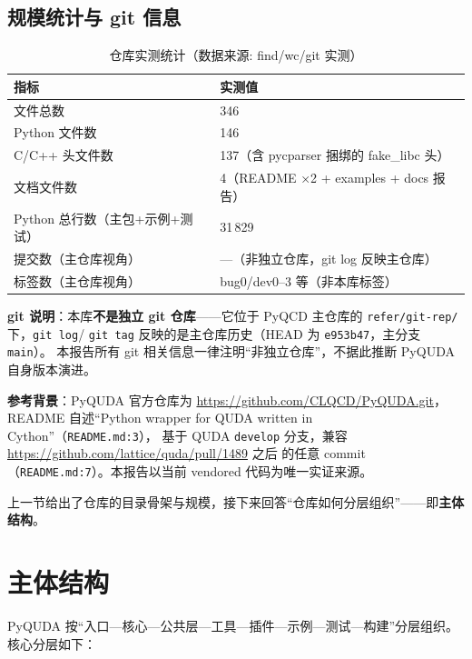 \documentclass[UTF8]{ctexart}
\begin{document}
\subsection{规模统计与 git 信息}
\begin{table}[htbp]\centering
\begin{tabular}{ll}
\toprule
指标 & 实测值 \\
\midrule
文件总数 & 346 \\
Python 文件数 & 146 \\
C/C++ 头文件数 & 137（含 pycparser 捆绑的 fake\_libc 头） \\
文档文件数 & 4（README ×2 + examples + docs 报告） \\
Python 总行数（主包+示例+测试） & 31\,829 \\
提交数（主仓库视角） & —（非独立仓库，git log 反映主仓库） \\
标签数（主仓库视角） & bug0/dev0–3 等（非本库标签） \\
\bottomrule
\end{tabular}
\caption{仓库实测统计（数据来源: find/wc/git 实测）}
\end{table}

\textbf{git 说明}：本库\textbf{不是独立 git 仓库}——它位于 PyQCD 主仓库的
\texttt{\nolinkurl{refer/git-rep/}} 下，\texttt{\nolinkurl{git log}}/
\texttt{\nolinkurl{git tag}} 反映的是主仓库历史（HEAD 为 \texttt{e953b47}，主分支 \texttt{main}）。
本报告所有 git 相关信息一律注明“非独立仓库”，不据此推断 PyQUDA 自身版本演进。

\begin{refbox}
\textbf{参考背景}：PyQUDA 官方仓库为 \url{https://github.com/CLQCD/PyQUDA.git}，
README 自述“Python wrapper for QUDA written in Cython”（\texttt{\nolinkurl{README.md:3}}），
基于 QUDA \texttt{develop} 分支，兼容 \url{https://github.com/lattice/quda/pull/1489} 之后
的任意 commit（\texttt{\nolinkurl{README.md:7}}）。本报告以当前 vendored 代码为唯一实证来源。
\end{refbox}

上一节给出了仓库的目录骨架与规模，接下来回答“仓库如何分层组织”——即\textbf{主体结构}。

\section{主体结构}

PyQUDA 按“入口—核心—公共层—工具—插件—示例—测试—构建”分层组织。核心分层如下：
\end{document}
